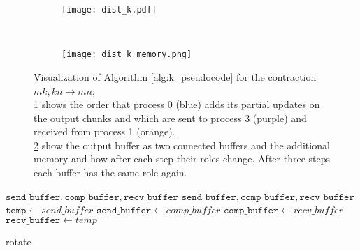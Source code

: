 \begin{figure}[ht]
    \centering
    \begin{subfigure}[t]{0.6\textwidth}
        \centering
        \texttt{[image: dist\_k.pdf]}
        \label{fig:k_algo_a}
    \end{subfigure}
    ~
    \begin{subfigure}[t]{0.35\textwidth}
        \centering\texttt{[image: dist\_k\_memory.png]}
        \label{fig:k_algo_b}
    \end{subfigure}
    \caption{Visualization of Algorithm \ref{alg:k_pseudocode} for the contraction $mk,kn \rightarrow mn$;\\
    \ref{fig:k_algo_a} shows the order that process 0 (blue) adds its partial updates on the output chunks and which are sent to process 3 (purple) and received from process 1 (orange).\\
    \ref{fig:k_algo_b} show the output buffer as two connected buffers and the additional memory and how after each step their roles change.
    After three steps each buffer has the same role again.
    }
    \label{fig:k_algo}
\end{figure}


\begin{algorithm}[ht]
    \begin{algorithmic}
        \Require $\texttt{send\_buffer},\texttt{comp\_buffer},\texttt{recv\_buffer}$
        \Ensure $\texttt{send\_buffer},\texttt{comp\_buffer},\texttt{recv\_buffer}$
        \State $\texttt{temp} \gets {send\_buffer}$
        \State $\texttt{send\_buffer} \gets {comp\_buffer}$
        \State $\texttt{comp\_buffer} \gets {recv\_buffer}$
        \State $\texttt{recv\_buffer} \gets {temp}$
    \end{algorithmic}
    \caption{rotate}
    \label{rotate_pseudocode}
\end{algorithm}

